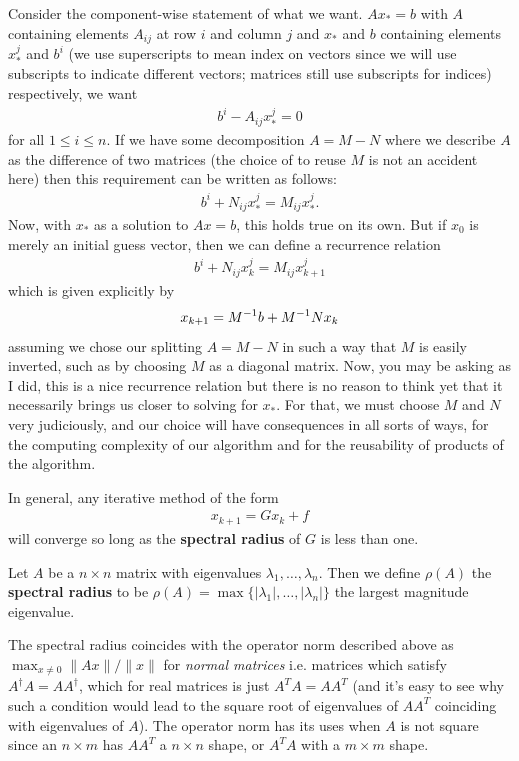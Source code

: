 \documentclass[11pt]{article}
\begin{document}
Consider the component-wise statement of what we want. $Ax_*=b$ with $A$ containing elements $A_{ij}$ at row $i$ and column $j$ and $x_*$ and $b$ containing elements $x^j_*$ and $b^i$ (we use superscripts to mean index on vectors since we will use subscripts to indicate different vectors; matrices still use subscripts for indices) respectively, we want \begin{gather*}
b^i - A_{ij} x^j_* = 0 
\end{gather*}
for all $1 \le i \le n$. If we have some decomposition $A = M - N$ where we describe $A$ as the difference of two matrices (the choice of to reuse $M$ is not an accident here) then this requirement can be written as follows: \begin{gather*}
b^i + N_{ij} x^{j}_* = M_{ij} x^{j}_*.
\end{gather*}
Now, with $x_*$ as a solution to $Ax=b$, this holds true on its own. But if $x_0$ is merely an initial guess vector, then we can define a recurrence relation \begin{gather*}
b^i + N_{ij} x^j_k = M_{ij} x^j_{k+1}
\end{gather*}
which is given explicitly by \begin{gather*}
x_{k+1} = M^{-1} b + M^{-1} N x_k
\end{gather*}
assuming we chose our splitting $A = M - N$ in such a way that $M$ is easily inverted, such as by choosing $M$ as a diagonal matrix. Now, you may be asking as I did, this is a nice recurrence relation but there is no reason to think yet that it necessarily brings us closer to solving for $x_*$. For that, we must choose $M$ and $N$ very judiciously, and our choice will have consequences in all sorts of ways, for the computing complexity of our algorithm and for the reusability of products of the algorithm.

In general, any iterative method of the form \begin{gather*}
x_{k+1} = G x_k + f
\end{gather*}
will converge so long as the \textbf{spectral radius} of $G$ is less than one. \begin{definition}
Let $A$ be a $n \times n$ matrix with eigenvalues $\lambda_1, \dots, \lambda_n$. Then we define $\rho(A)$ the \textbf{spectral radius} to be $\rho(A) = \max \{ |\lambda_1|, \dots, |\lambda_n| \}$ the largest magnitude eigenvalue.  
\end{definition}
The spectral radius coincides with the operator norm described above as $\max_{x \neq 0} \lVert Ax \rVert / \lVert x \rVert$ for \emph{normal matrices} i.e. matrices which satisfy $A^\dagger A = A A^\dagger$, which for real matrices is just $A^T A = A A^T$ (and it's easy to see why such a condition would lead to the square root of eigenvalues of $AA^T$ coinciding with eigenvalues of $A$). The operator norm has its uses when $A$ is not square since an $n\times m$ has $A A^T$ a $n \times n$ shape, or $A^T A$ with a $m \times m$ shape.
\end{document}
